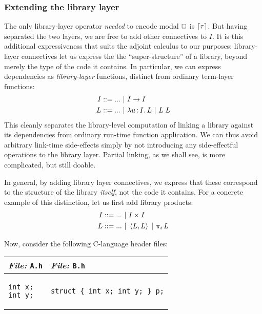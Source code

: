 \documentclass[11pt]{article}
\begin{document}

\subsubsection{Extending the library layer}

The only library-layer operator \emph{needed} to encode modal $\Box$ is
$\lceil{\tau}\rceil$. But having separated the two layers, we are free to add other
connectives to $I$. It is this additional expressiveness that suits the adjoint
calculus to our purposes: library-layer connectives let us express the the
``super-structure'' of a library, beyond merely the type of the code it
contains. In particular, we can express dependencies as \emph{library-layer}
functions, distinct from ordinary term-layer functions:
\begin{align*}
  I &::= ... ~|~ I \to I\\
  L &::= ... ~|~ \lambda u \mathop{:} I .\: L ~|~ L \; L
\end{align*}
This cleanly separates the library-level computation of linking a library
against its dependencies from ordinary run-time function application. We can
thus avoid arbitrary link-time side-effects simply by not introducing any
side-effectful operations to the library layer. Partial linking, as we shall
see, is more complicated, but still doable.

In general, by adding library layer connectives, we express that these
correspond to the structure of the library \emph{itself}, not the code it
contains. For a concrete example of this distinction, let us first add library
products:
\begin{align*}
  I &::= ... ~|~ I \times I\\
  L &::= ... ~|~ \left\langle L, L\right\rangle ~|~ \pi_{i} \, L
\end{align*}

Now, consider the following C-language header files:
\begin{center}
  \begin{tabular}{l|l}
    \emph{File:} \texttt{A.h} & \emph{File:} \texttt{B.h}\\\hline
    \begin{minipage}[t]{0.35\linewidth}
\begin{verbatim}
int x;
int y;
\end{verbatim}
    \end{minipage} &
    \begin{minipage}[t]{0.35\linewidth}
\begin{verbatim}
struct { int x; int y; } p;
\end{verbatim}
    \end{minipage}
  \end{tabular}
\end{center}
\end{document}
